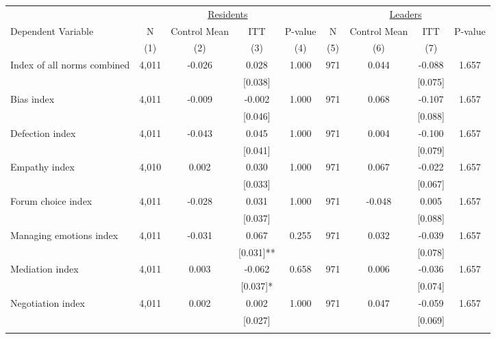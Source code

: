 \begin{tabular}{lcccccccc}
\hline \noalign{\smallskip} & \multicolumn{4}{c}{\uline{\hfill Residents \hfill}} & \multicolumn{4}{c}{\uline{\hfill Leaders \hfill}}\\
Dependent Variable & N & Control Mean & ITT & P-value & N & Control Mean & ITT & P-value\\
 & (1) & (2) & (3) & (4) & (5) & (6) & (7) & \\
\noalign{\smallskip}\hline \noalign{\smallskip}Index of all norms combined & 4,011 & -0.026 & 0.028 & 1.000 & 971 & 0.044 & -0.088 & 1.657\\
 &  &  & [0.038] &  &  &  & [0.075] & \\
\quad Bias index & 4,011 & -0.009 & -0.002 & 1.000 & 971 & 0.068 & -0.107 & 1.657\\
 &  &  & [0.046] &  &  &  & [0.088] & \\
\quad Defection index & 4,011 & -0.043 & 0.045 & 1.000 & 971 & 0.004 & -0.100 & 1.657\\
 &  &  & [0.041] &  &  &  & [0.079] & \\
\quad Empathy index & 4,010 & 0.002 & 0.030 & 1.000 & 971 & 0.067 & -0.022 & 1.657\\
 &  &  & [0.033] &  &  &  & [0.067] & \\
\quad Forum choice index & 4,011 & -0.028 & 0.031 & 1.000 & 971 & -0.048 & 0.005 & 1.657\\
 &  &  & [0.037] &  &  &  & [0.088] & \\
\quad Managing emotions index & 4,011 & -0.031 & 0.067 & 0.255 & 971 & 0.032 & -0.039 & 1.657\\
 &  &  & [0.031]** &  &  &  & [0.078] & \\
\quad Mediation index & 4,011 & 0.003 & -0.062 & 0.658 & 971 & 0.006 & -0.036 & 1.657\\
 &  &  & [0.037]* &  &  &  & [0.074] & \\
\quad Negotiation index & 4,011 & 0.002 & 0.002 & 1.000 & 971 & 0.047 & -0.059 & 1.657\\
 &  &  & [0.027] &  &  &  & [0.069] & \\
\noalign{\smallskip}\hline\end{tabular}
